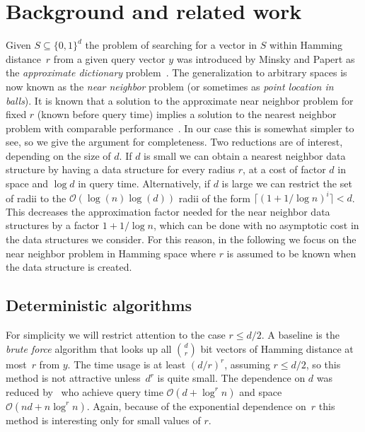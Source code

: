 \documentclass[prodmode,acmtalg]{acmsmall}
\newcommand{\Osymbol}{{\mathcal O}}
\newcommand{\BO}[1]{\Osymbol\left(#1\right)}
\begin{document}
\section{Background and related work}

Given $S\subseteq \{0,1\}^d$ the problem of searching for a vector in $S$ within Hamming distance~$r$ from a given query vector $y$ was introduced by Minsky and Papert as the \emph{approximate dictionary} problem~\cite{minsky1987perceptrons}.
The generalization to arbitrary spaces is now known as the \emph{near neighbor} problem (or sometimes as \emph{point location in balls}).
It is known that a solution to the approximate near neighbor problem for fixed $r$ (known before query time) implies a solution to the nearest neighbor problem with comparable performance~\cite{Indyk1998,HarPeled2012}.
In our case this is somewhat simpler to see, so we give the argument for completeness.
Two reductions are of interest, depending on the size of $d$.
If $d$ is small we can obtain a nearest neighbor data structure by having a data structure for every radius $r$, at a cost of factor $d$ in space and $\log d$ in query time.
Alternatively, if $d$ is large we can restrict the set of radii to the $\BO{\log(n)\log(d)}$ radii of the form $\lceil(1+1/\log n)^i\rceil < d$.
This decreases the approximation factor needed for the near neighbor data structures by a factor $1+1/\log n$, which can be done with no asymptotic cost in the data structures we consider.
For this reason, in the following we focus on the near neighbor problem in Hamming space where $r$ is assumed to be known when the data structure is created.


\subsection{Deterministic algorithms}


For simplicity we will restrict attention to the case $r\leq d/2$.
A baseline is the \emph{brute force} algorithm that looks up all $\binom{d}{r}$ bit vectors of Hamming distance at most~$r$ from $y$.
The time usage is at least $(d/r)^r$, assuming $r\leq d/2$, so this method is not attractive unless~$d^r$ is quite small.
The dependence on $d$ was reduced by~\cite{Cole:2004:DMI:1007352.1007374} who achieve query time $\BO{d+\log^r n}$ and space $\BO{nd + n \log^r n}$.
Again, because of the exponential dependence on~$r$ this method is interesting only for small values of $r$.
\end{document}
